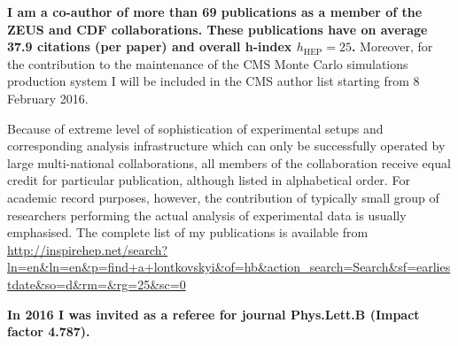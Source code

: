 \textbf{I am a co-author of more than 69 publications as a member of the ZEUS and CDF collaborations. These publications have on average 37.9 citations (per paper) and overall h-index  $h_\mathrm{HEP}=25$.} Moreover, for the contribution to the maintenance of the CMS Monte Carlo simulations production system I will be included in the CMS author list starting from 8 February 2016.

Because of extreme level of sophistication of experimental setups and corresponding analysis infrastructure which can only be successfully operated by large multi-national collaborations, all members of the collaboration receive equal credit for particular publication, although listed in alphabetical order. For academic record purposes, however, the contribution of typically small group of researchers performing the actual analysis of experimental data is usually emphasised. The complete list of my publications is available from \url{http://inspirehep.net/search?ln=en&ln=en&p=find+a+lontkovskyi&of=hb&action_search=Search&sf=earliestdate&so=d&rm=&rg=25&sc=0}

\textbf{In 2016 I was invited as a referee for journal \textbf{Phys.Lett.B} (Impact factor 4.787).}


